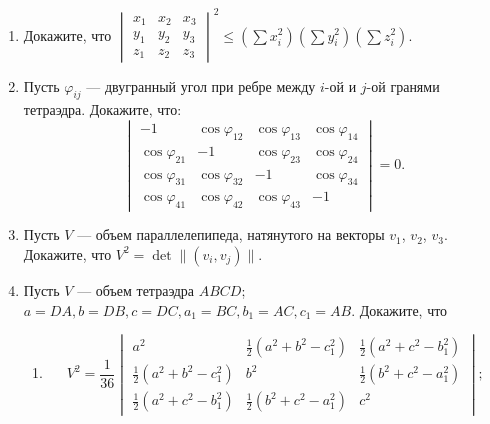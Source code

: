 \begin{enumerate}
		\item Докажите, что $\begin{vmatrix}
			x_1 & x_2 & x_3 \\
			y_1 & y_2 & y_3 \\
			z_1 & z_2 & z_3
		\end{vmatrix}^2 \le (\sum x_i^2)(\sum y_i^2)(\sum z_i^2)$.

		\item Пусть $\varphi_{ij}$ — двугранный угол при ребре между $i$-ой и $j$-ой гранями тетраэдра. Докажите, что:
			\[ 
				\begin{vmatrix}
					-1 & \cos \varphi_{12} & \cos \varphi_{13} & \cos \varphi_{14} \\
					\cos \varphi_{21} & -1 & \cos \varphi_{23} & \cos \varphi_{24} \\
					\cos \varphi_{31} & \cos \varphi_{32} & -1 & \cos \varphi_{34} \\
					\cos \varphi_{41} & \cos \varphi_{42} & \cos \varphi_{43} & -1
				\end{vmatrix} = 0.
				\] 
		\item Пусть $V$ — объем параллелепипеда, натянутого на векторы $v_1$, $v_2$, $v_3$. Докажите, что $V^2 = \det \|(v_i, v_j)\|$.

		\item Пусть $V$ — объем тетраэдра $ABCD$; $a=DA, b=DB, c=DC, a_1=BC, b_1=AC, c_1=AB$. Докажите, что
		\begin{enumerate}
			\item 
			\[
				V^2 = \frac{1}{36} \begin{vmatrix}
					a^2 & \frac{1}{2}(a^2+b^2-c_1^2) & \frac{1}{2}(a^2+c^2-b_1^2) \\
					\frac{1}{2}(a^2+b^2-c_1^2) & b^2 & \frac{1}{2}(b^2+c^2-a_1^2) \\
					\frac{1}{2}(a^2+c^2-b_1^2) & \frac{1}{2}(b^2+c^2-a_1^2) & c^2
				\end{vmatrix};
			\]


\end{enumerate}
\end{enumerate}
